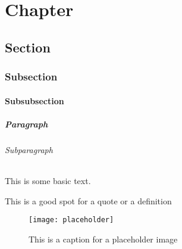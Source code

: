 \chapter{Chapter} %

\section{Section} %

\subsection{Subsection} %

\subsubsection{Subsubsection} %

\paragraph{Paragraph} %

\subparagraph{Subparagraph}  %

This is some basic text.

\begin{formal}
	This is a good spot for a quote or a definition
\end{formal}

\begin{figure}[H]
    \centering
    \texttt{[image: placeholder]}
    \caption{This is a caption for a placeholder image}
\end{figure}
